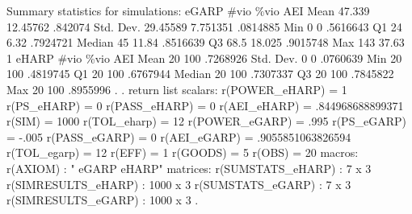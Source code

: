 Summary statistics for simulations:
{\smallskip}
       eGARP {\VBAR}      \#vio       \%vio        AEI 
        Mean {\VBAR}    47.339   12.45762    .842074 
   Std. Dev. {\VBAR}  29.45589   7.751351   .0814885 
         Min {\VBAR}         0          0   .5616643 
          Q1 {\VBAR}        24       6.32   .7924721 
      Median {\VBAR}        45      11.84   .8516639 
          Q3 {\VBAR}      68.5     18.025   .9015748 
         Max {\VBAR}       143      37.63          1 
{\smallskip}
       eHARP {\VBAR}      \#vio       \%vio        AEI 
        Mean {\VBAR}        20        100   .7268926 
   Std. Dev. {\VBAR}         0          0   .0760639 
         Min {\VBAR}        20        100   .4819745 
          Q1 {\VBAR}        20        100   .6767944 
      Median {\VBAR}        20        100   .7307337 
          Q3 {\VBAR}        20        100   .7845822 
         Max {\VBAR}        20        100   .8955996 
{\smallskip}
. 
. return list
{\smallskip}
scalars:
        r(POWER_eHARP) =  1
           r(PS_eHARP) =  0
         r(PASS_eHARP) =  0
          r(AEI_eHARP) =  .844968688899371
                r(SIM) =  1000
          r(TOL_eharp) =  12
        r(POWER_eGARP) =  .995
           r(PS_eGARP) =  -.005
         r(PASS_eGARP) =  0
          r(AEI_eGARP) =  .9055851063826594
          r(TOL_egarp) =  12
                r(EFF) =  1
              r(GOODS) =  5
                r(OBS) =  20
{\smallskip}
macros:
              r(AXIOM) : " eGARP eHARP"
{\smallskip}
matrices:
     r(SUMSTATS_eHARP) :  7 x 3
   r(SIMRESULTS_eHARP) :  1000 x 3
     r(SUMSTATS_eGARP) :  7 x 3
   r(SIMRESULTS_eGARP) :  1000 x 3
{\smallskip}
. 
